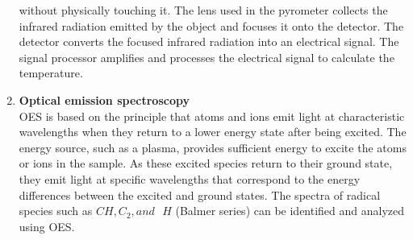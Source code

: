 \documentclass[]{report}[12 pt]
\begin{document}
\begin{enumerate}
		without physically touching it. The lens used in the pyrometer collects the infrared radiation
		emitted by the object and focuses it onto the detector. The detector converts the focused
		infrared radiation into an electrical signal. The signal processor amplifies and processes the
		electrical signal to calculate the temperature.
		\item \textbf{Optical emission spectroscopy}\\
		OES is based on the principle that atoms and ions emit light at characteristic wavelengths
		when they return to a lower energy state after being excited. The energy source, such as a
		plasma, provides sufficient energy to excite the atoms or ions in the sample. As these excited
		species return to their ground state, they emit light at specific wavelengths that correspond to
		the energy differences between the excited and ground states. The spectra of radical species
		such as $CH, C_2 , and \text{ }H$ (Balmer series) can be identified and analyzed using OES.
	\end{enumerate}
\end{document}
